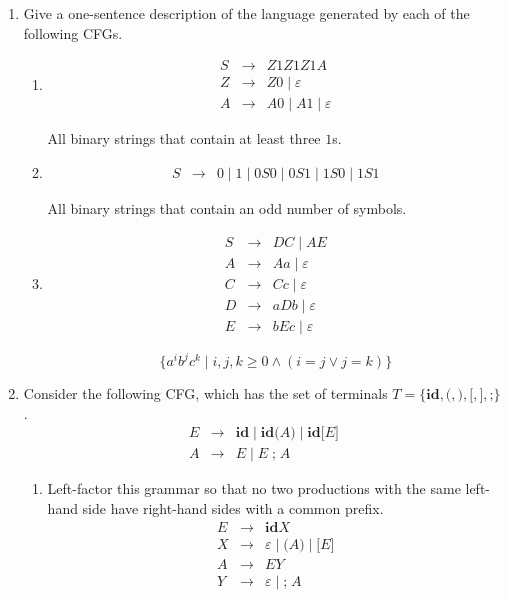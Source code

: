 \documentclass[11pt]{article}
\begin{document}
\begin{enumerate}
\item Give a one-sentence description of the language generated by
each of the following CFGs.

\begin{enumerate}

\item
\begin{eqnarray*}
S & \rightarrow & Z1Z1Z1A \\
Z & \rightarrow & Z0 \mid \varepsilon \\
A & \rightarrow & A0 \mid A1 \mid \varepsilon
\end{eqnarray*}

All binary strings that contain at least three $1$s.

\item
\begin{eqnarray*}
S & \rightarrow & 0 \mid 1 \mid 0S0 \mid 0S1 \mid 1S0 \mid 1S1
\end{eqnarray*}

All binary strings that contain an odd number of symbols.

\item
\begin{eqnarray*}
S & \rightarrow & DC \mid AE \\
A & \rightarrow & Aa \mid \varepsilon \\
C & \rightarrow & Cc \mid \varepsilon \\
D & \rightarrow & aDb \mid \varepsilon \\
E & \rightarrow & bEc \mid \varepsilon
\end{eqnarray*}

\[
\{a^{i}b^{j}c^{k} \mid i, j, k \geq 0 \land (i = j \lor j = k)\}
\]

\end{enumerate}

\item Consider the following CFG, which has the set of terminals
$T = \{ \textbf{id}, \textbf{(}, \textbf{)}, \textbf{[}, \textbf{]},
\textbf{;} \}$.
\begin{eqnarray*}
E & \rightarrow &
\mathbf{id} \mid \mathbf{id} \textbf{(} A \textbf{)} \mid \textbf{id}
\textbf{[} E \textbf{]} \\
A & \rightarrow & E \mid E \; \textbf{;} \; A
\end{eqnarray*}

\begin{enumerate}

\item Left-factor this grammar so that no two productions with the
same left-hand side have right-hand sides with a common prefix.
\begin{eqnarray*}
E & \rightarrow & \mathbf{id} X \\
X & \rightarrow & \varepsilon \mid \textbf{(} A \textbf{)}
\mid \textbf{[} E \textbf{]} \\
A & \rightarrow & E Y \\
Y & \rightarrow & \varepsilon \mid \textbf{;} \; A
\end{eqnarray*}


\end{enumerate}
\end{enumerate}
\end{document}

